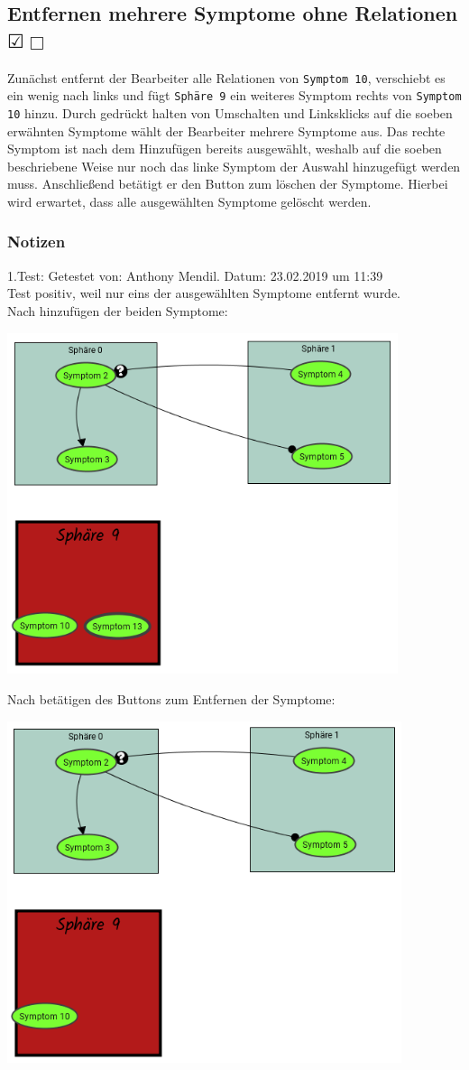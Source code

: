 \documentclass[enabledeprecatedfontcommands]{scrartcl}
\newcommand{\subsectiont}[2]{\subsection[#1]{#1{\normalsize\normalfont #2}}}
\newcommand{\leer}{$\Box$}
\newcommand{\ok}{$\CheckedBox$}
\begin{document}
\subsectiont{Entfernen mehrere Symptome ohne Relationen}{\dotfill\XBox\ok\leer}
Zunächst entfernt der Bearbeiter alle Relationen von \texttt{Symptom 10}, verschiebt es ein wenig nach links und fügt \texttt{Sphäre 9} ein weiteres Symptom rechts von \texttt{Symptom 10} hinzu. 
Durch gedrückt halten von Umschalten und Linksklicks auf die soeben erwähnten Symptome wählt der Bearbeiter mehrere Symptome aus. Das rechte Symptom ist nach dem Hinzufügen bereits ausgewählt, weshalb auf die soeben beschriebene Weise nur noch das linke Symptom der Auswahl hinzugefügt werden muss. Anschließend betätigt er den Button zum löschen der Symptome. Hierbei wird erwartet, dass alle ausgewählten Symptome gelöscht werden. 
\subsubsection{Notizen}
1.Test: Getestet von: Anthony Mendil. Datum: 23.02.2019 um 11:39 \\
Test positiv, weil nur eins der ausgewählten Symptome entfernt wurde. \\
Nach hinzufügen der beiden Symptome: 
\begin{center}
\includegraphics[height=10cm]{2_22vorher.PNG}
\end{center}
Nach betätigen des Buttons zum Entfernen der Symptome: 
\begin{center}
\includegraphics[height=10cm]{2_22nachher.PNG}
\end{center}
\end{document}
